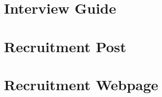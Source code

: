 \documentclass[11pt
              , a4paper
              , twoside
              , openright
              ]{report}
\begin{document}
\chapter{Interview Guide}

\chapter{Recruitment Post}

\chapter{Recruitment Webpage}




\backmatter



%


\end{document}
